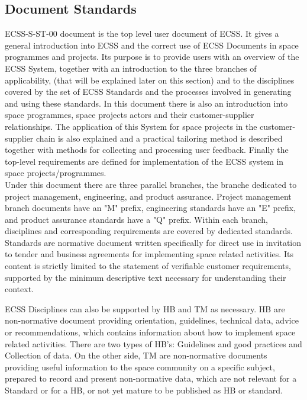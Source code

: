 \subsection{Document Standards}
ECSS-S-ST-00\cite{ecss-s-st-00c} document is the top level user document of \ac{ECSS}.
It gives a general introduction into \ac{ECSS} and the correct use of \ac{ECSS} Documents in space
programmes and projects.
Its purpose is to provide users with an overview of the \ac{ECSS} System, together
with an introduction to the three branches of applicability, (that will be explained later on this section) and to the disciplines
covered by the set of \ac{ECSS} Standards and the processes involved in generating
and using these standards.
In this document there is also an introduction into space programmes, space projects actors and their
customer-supplier relationships. The application of this System for space projects in the customer-supplier
chain is also explained and a practical tailoring method is described together with
methods for collecting and processing user feedback.
Finally the top-level requirements are defined for implementation of the \ac{ECSS}
system in space projects/programmes\cite{ecss-s-st-00c}.\\

Under this document there are three parallel branches, the branche dedicated to project management,
engineering, and product assurance.
Project management branch documents have an "M" prefix, engineering standards have an "E" prefix, and product assurance standards have a "Q" prefix.
Within each branch, disciplines and corresponding requirements are covered by dedicated standards.
Standards are normative document written specifically for direct use in invitation to tender and 
business agreements for implementing space related activities. Its content 
is strictly limited to the statement of verifiable customer requirements, supported 
by the minimum descriptive text necessary for understanding their context.

\ac{ECSS} Disciplines can also be supported by \ac{HB} and \ac{TM} as necessary\cite{ecss-s-st-00c}.
\ac{HB} are non-normative document providing orientation, 
guidelines, technical data, advice or recommendations, which contains 
information about how to implement space related activities. There are two types of \ac{HB}'s: Guidelines and good practices and Collection of data.
On the other side, \ac{TM} are non-normative documents providing useful information to the space community 
on a specific subject, prepared to record and present non-normative data, which 
are not relevant for a Standard or for a \ac{HB}, or not yet mature to be published as \ac{HB} or standard.

